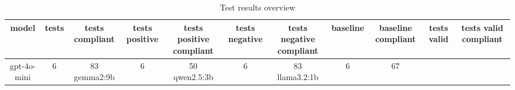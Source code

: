 
  \begin{table}[h!]
  \centering
  \begin{tabular}{|c|c|c|c|c|c|c|c|c|c|c|}
  \hline
  model & tests & tests compliant & tests positive & tests positive compliant & tests negative & tests negative compliant & baseline & baseline compliant & tests valid & tests valid compliant \\
  \hline
  gpt-4o-mini & 6 & 83%
\hline
gemma2:9b & 6 & 50%
\hline
qwen2.5:3b & 6 & 83%
\hline
llama3.2:1b & 6 & 67%
  \end{tabular}
  \caption{Test results overview}
  
  \end{table}
  